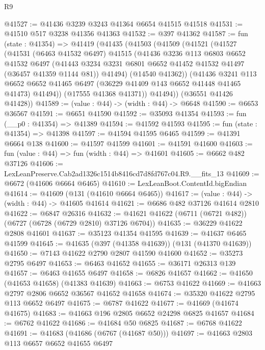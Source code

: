 \begin{lexlean}{R9}
\begin{coremodule}
@41527 := @41436 @3239 @3243 @41364 @6654 @41515 @41518
@41531 := @41510 @517 @3238 @41356 @41363
@41532 := @397 @41362
@41587 := fun (state : @41354) =>
  @41419
    (@41435
      (@41503
        (@41509
          (@41521
            (@41527
              (@41531
                (@6463 @41532 @6497)
                @41515
                (@41436
                  @3236
                  @113
                  @6803
                  @6652
                  @41532
                  @6497
                  (@41443 @3234 @3231 @6801 @6652 @41452 @41532 @41497 (@36457 @41359 @1144 @81))
                  @41494)
                (@14540 @41362))
              (@41436
                @3241
                @113
                @6652
                @6652
                @41465
                @6497
                (@36229 @41409 @143 @6652 @41448 @41465 @41473)
                @41494))
            (@17555 @41368 @41371))
          @41494))
      (@36551 @41426 @41428))
@41589 := (value : @44) -> (width : @44) -> @6648
@41590 := @6653 @36567
@41591 := @6651 @41590
@41592 := @35093 @41354
@41593 := fun (__p0 : @41354) => @41389
@41594 := @41592 @41593
@41595 := fun (state : @41354) => @41398
@41597 := @41594 @41595 @6465
@41599 := @41391 @6664 @138
@41600 := @41597 @41599
@41601 := @41591 @41600
@41603 := fun (value : @44) => fun (width : @44) => @41601
@41605 := @6662 @482 @37126
@41606 := LexLeanPreserve.Cab2ad1326c1514b8416cd7d8fd767c04.R9.__fits_13
@41609 := @6672 (@41606 @6664 @6465)
@41610 := LexLeanBoot.ContentId.bigEndian
@41614 := @41609 (@131 (@41610 @6664 @6465))
@41617 := (value : @44) -> (width : @44) -> @41605 @41614
@41621 := @6686 @482 @37126 @41614 @2810
@41622 := @6847 @26316
@41632 := @41621 @41622 (@6711 (@6721 @482)) (@6727 (@6728 (@6729 @2810) @37126 @6704))
@41635 := @36229 @41622 @2808 @41601
@41637 := @35123 @41354 @41595
@41639 := @41637 @6465 @41599
@41645 := @41635 (@397 (@41358 @41639)) (@131 (@41370 @41639))
@41650 := @7143 @41622 @2790 @2807 @41590 @41600
@41652 := @35273 @2795 @6497
@41653 := @6463 @41652
@41655 := @36171 @26313 @139
@41657 := @6463 @41655 @6497
@41658 := @6826 @41657
@41662 := @41650 (@41653 @41658) (@41383 @41639)
@41663 := @6753 @41622
@41669 := @41663 @2797 @2806 @6652 @36567 @41652 @41658
@41674 := @35320 @41622 @2795 @113 @6652 @6497
@41675 := @6787 @41622
@41677 := @41669 (@41674 @41675)
@41683 := @41663 @196 @2805 @6652 @24298 @6825 @41657
@41684 := @6762 @41622
@41686 := @41684 @50 @6825
@41687 := @6768 @41622
@41691 := @41683 (@41686 (@6767 (@41687 @50)))
@41697 := @41663 @2803 @113 @6657 @6652 @41655 @6497

\end{coremodule}
\end{lexlean}

